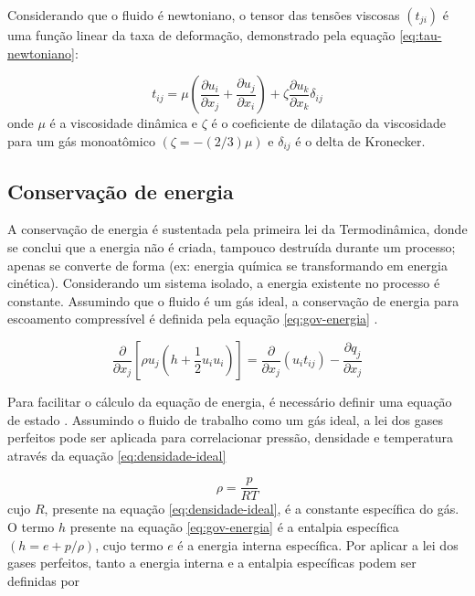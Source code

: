 Considerando que o fluido é newtoniano, o tensor das tensões viscosas \(\left(t_{ji}\right)\) é uma função linear da taxa de deformação, demonstrado pela equação \ref{eq:tau-newtoniano}:

\begin{equation}
    \label{eq:tau-newtoniano}
    t_{ij} = \mu \left(\frac{\partial u_i}{\partial x_j} + \frac{\partial u_j}{\partial x_i} \right) + \zeta\frac{\partial u_k}{\partial x_k}\delta_{ij}
\end{equation}
%
onde \(\mu\) é a viscosidade dinâmica e \(\zeta\) é o coeficiente de dilatação da viscosidade para um gás monoatômico \(\left(\zeta = -(2/3)\mu\right)\) e \(\delta_{ij}\) é o delta de Kronecker. 

\subsection{Conservação de energia}

A conservação de energia é sustentada pela primeira lei da Termodinâmica, donde se conclui que a energia não é criada, tampouco destruída durante um processo; apenas se converte de forma (ex: energia química se transformando em energia cinética). Considerando um sistema isolado, a energia existente no processo é constante. Assumindo que o fluido é um gás ideal, a conservação de energia para escoamento compressível é definida pela equação \ref{eq:gov-energia} \cite{Moukalled2015, Wilcox2006}.

\begin{equation}
    \label{eq:gov-energia}
   \frac{\partial}{\partial x_j}\left[\rho u_j\left(h + \frac{1}{2}u_i u_i \right)\right] = \frac{\partial}{\partial x_j}\left(u_i t_{ij}\right) - \frac{\partial q_j}{\partial x_j}
\end{equation}

Para facilitar o cálculo da equação de energia, é necessário definir uma equação de estado \cite{Wilcox2006}. Assumindo o fluido de trabalho como um gás ideal, a lei dos gases perfeitos pode ser aplicada para correlacionar pressão, densidade e temperatura através da equação \ref{eq:densidade-ideal}

\begin{equation}
    \label{eq:densidade-ideal}
    \rho = \frac{p}{RT}
\end{equation}
%
cujo \(R\), presente na equação \ref{eq:densidade-ideal}, é a constante específica do gás. O termo \(h\) presente na equação \ref{eq:gov-energia} é a entalpia específica \(\left(h = e + p/\rho\right)\), cujo termo \(e\) é a energia interna específica. Por aplicar a lei dos gases perfeitos, tanto a energia interna e a entalpia específicas podem ser definidas por

